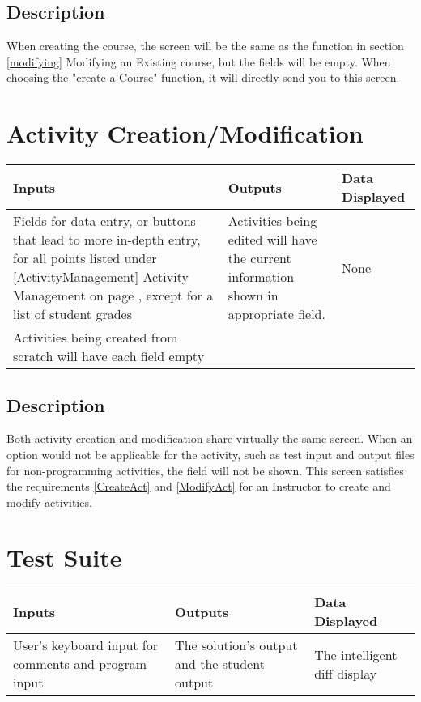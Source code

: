 \documentclass{article}
\begin{document}
\subsection{Description}
When creating the course, the screen will be the same as the function in section
\ref{modifying} Modifying an Existing course, but the fields will be empty.
When choosing the "create a Course" function, it will directly send you to this screen.

\section{Activity Creation/Modification}
\begin{tabular}{| p{5cm} | p{5cm} | p{5cm} |}
	\hline
	Inputs & Outputs & Data Displayed \\ \hline
	Fields for data entry, or buttons that lead to more in-depth entry, for all points listed under \ref{ActivityManagement} Activity Management on page \pageref{ActivityManagement}, except for a list of student grades
	& Activities being edited will have the current information shown in appropriate field. & None
	\\Activities being created from scratch will have each field empty & &
	\\ \hline
\end{tabular}

\subsection{Description}
Both activity creation and modification share virtually the same screen.
When an option would not be applicable for the activity, such as test input and
output files for non-programming activities, the field will not be shown.
This screen satisfies the requirements \ref{CreateAct} and \ref{ModifyAct} for
an Instructor to create and modify activities.

\section{Test Suite}
\begin{tabular}{| p{5cm} | p{5cm} | p{5cm} |}
	\hline
	Inputs & Outputs & Data Displayed \\ \hline
	User's keyboard input for comments and program input
	& The solution's output and the student output
	& The intelligent diff display
	
	\\ \hline
\end{tabular}
\end{document}
